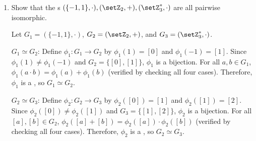 \begin{enumerate}
  \item Show that the s \((\{-1, 1\}, \cdot), (\setZ_{2}, +), (\setZ_{3}^{*}, \cdot)\) are all pairwise isomorphic.
  \begin{subprove}
    Let \(G_{1} = (\{-1, 1\}, \cdot)\), \(G_{2} = (\setZ_{2}, +)\), and \(G_{3} = (\setZ_{3}^{*}, \cdot)\).
    
    \(G_{1} \simeq G_{2}\): Define \(\phi_{1}: G_{1} \to G_{2}\) by \(\phi_{1}(1) = [0]\) and \(\phi_{1}(-1) = [1]\). Since \(\phi_{1}(1) \neq \phi_{1}(-1)\) and \(G_{2} = \{[0], [1]\}\), \(\phi_{1}\) is a bijection. For all \(a, b \in G_{1}\), \(\phi_{1}(a \cdot b) = \phi_{1}(a) + \phi_{1}(b)\) (verified by checking all four cases). Therefore, \(\phi_{1}\) is a , so \(G_{1} \simeq G_{2}\).
    
    \(G_{2} \simeq G_{3}\): Define \(\phi_{2}: G_{2} \to G_{3}\) by \(\phi_{2}([0]) = [1]\) and \(\phi_{2}([1]) = [2]\). Since \(\phi_{2}([0]) \neq \phi_{2}([1])\) and \(G_{3} = \{[1], [2]\}\), \(\phi_{2}\) is a bijection. For all \([a], [b] \in G_{2}\), \(\phi_{2}([a] + [b]) = \phi_{2}([a]) \cdot \phi_{2}([b])\) (verified by checking all four cases). Therefore, \(\phi_{2}\) is a , so \(G_{2} \simeq G_{3}\).
    

\end{subprove}
\end{enumerate}
